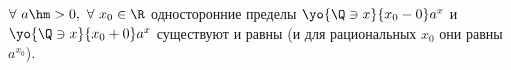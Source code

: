 \label{vdeg}
    $\forall\  a\hm>0,\ \forall\  x_0\in\R$ односторонние пределы $\yo{\Q\ni x}{x_0-0}a^x$ и $\yo{\Q\ni x}{x_0+0}a^x$ существуют и равны (и для рациональных $x_0$ они равны $a^{x_0}$).
